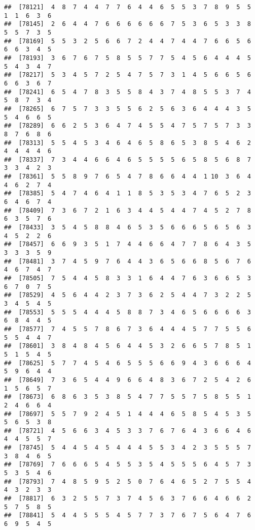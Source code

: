 \documentclass[
]{book}
\begin{document}
\begin{verbatim}
##  [78121]  4  8  7  4  4  7  7  6  4  4  6  5  5  3  7  8  9  5  5  1  1  6  3  6
##  [78145]  2  6  4  4  7  6  6  6  6  6  6  7  5  3  6  5  3  3  8  5  5  7  3  5
##  [78169]  5  5  3  2  5  6  6  7  2  4  4  7  4  4  7  6  6  5  6  6  6  3  4  5
##  [78193]  3  6  7  6  7  5  8  5  5  7  7  5  4  5  6  4  4  4  5  5  4  3  4  7
##  [78217]  5  3  4  5  7  2  5  4  7  5  7  3  1  4  5  6  6  5  6  6  6  3  6  7
##  [78241]  6  5  4  7  8  3  5  5  8  4  3  7  4  8  5  5  3  7  4  5  8  7  3  4
##  [78265]  6  7  5  7  3  3  5  5  6  2  5  6  3  6  4  4  4  3  5  5  4  6  6  5
##  [78289]  6  6  2  5  3  6  4  7  4  5  5  4  7  5  7  5  7  3  3  8  7  6  8  6
##  [78313]  5  5  4  5  3  4  6  4  6  5  8  6  5  3  8  5  4  6  2  4  4  4  4  6
##  [78337]  7  3  4  4  6  6  4  6  5  5  5  5  6  5  8  5  6  8  7  3  3  4  2  3
##  [78361]  5  5  8  9  7  6  5  4  7  8  6  6  4  4  1 10  3  6  4  4  6  2  7  4
##  [78385]  5  4  7  4  6  4  1  1  8  5  3  5  3  4  7  6  5  2  3  6  4  6  7  4
##  [78409]  7  3  6  7  2  1  6  3  4  4  5  4  4  7  4  5  2  7  8  6  3  5  7  6
##  [78433]  3  5  4  5  8  8  4  6  5  3  5  6  6  6  5  6  5  6  3  4  5  2  2  6
##  [78457]  6  6  9  3  5  1  7  4  4  6  6  4  7  7  8  6  4  3  5  3  3  3  5  9
##  [78481]  3  7  4  5  9  7  6  4  4  3  6  5  6  6  8  5  6  7  6  4  6  7  4  7
##  [78505]  7  5  4  4  5  8  3  3  1  6  4  4  7  6  3  6  6  5  3  6  7  0  7  5
##  [78529]  4  5  6  4  4  2  3  7  3  6  2  5  4  4  7  3  2  2  5  3  4  5  4  5
##  [78553]  5  5  5  4  4  4  5  8  8  7  3  4  6  5  6  6  6  6  3  6  8  4  4  5
##  [78577]  7  4  5  5  7  8  6  7  3  6  4  4  4  5  7  7  5  5  6  5  5  4  4  7
##  [78601]  3  8  4  8  4  5  6  4  4  5  3  2  6  6  5  7  8  5  1  5  1  5  4  5
##  [78625]  5  7  7  4  5  4  6  5  5  5  6  6  9  4  3  6  6  6  4  5  9  6  4  4
##  [78649]  7  3  6  5  4  4  9  6  6  4  8  3  6  7  2  5  4  2  6  1  5  6  5  7
##  [78673]  6  8  6  3  5  3  8  5  4  7  7  5  5  7  5  8  5  5  1  2  4  6  6  4
##  [78697]  5  5  7  9  2  4  5  1  4  4  4  6  5  8  5  4  5  3  5  5  6  5  3  8
##  [78721]  4  5  6  6  3  4  5  3  3  7  6  7  6  4  3  6  6  4  6  4  4  5  5  7
##  [78745]  5  4  4  5  4  5  4  4  4  5  5  3  4  2  3  5  5  5  7  3  8  4  6  5
##  [78769]  7  6  6  6  5  4  5  5  3  5  4  5  5  5  6  4  5  7  3  5  3  5  4  6
##  [78793]  7  4  8  5  9  5  2  5  0  7  6  4  6  5  2  7  5  5  4  4  3  2  3  3
##  [78817]  6  3  2  5  5  7  3  7  4  5  6  3  7  6  6  4  6  6  2  5  7  5  8  5
##  [78841]  5  4  4  5  5  5  4  5  7  7  3  7  6  7  5  6  4  7  6  6  9  5  4  5

\end{verbatim}
\end{document}
